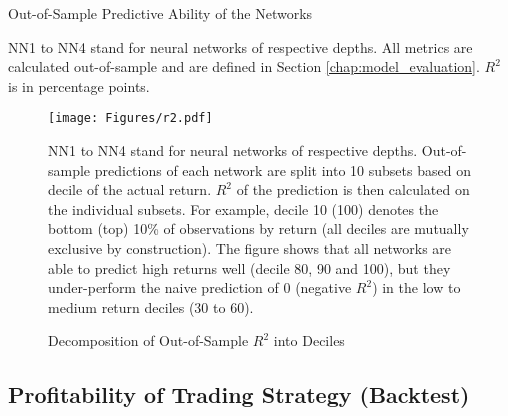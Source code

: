 			\begin{table}
				\centering
				
				\caption{Out-of-Sample Predictive Ability of the Networks}
				\label{tab:performance}
				\medskip
				\small
				NN1 to NN4 stand for neural networks of respective depths. All metrics are calculated out-of-sample and are defined in Section \ref{chap:model_evaluation}.  $R^2$ is in percentage points.  
			\end{table}
		
			\begin{figure}
				\texttt{[image: Figures/r2.pdf]}
				\caption{Decomposition of Out-of-Sample $R^2$ into Deciles}
				\label{fig:r2}
				\medskip
				\small 
				NN1 to NN4 stand for neural networks of respective depths. Out-of-sample predictions of each network are split into 10 subsets based on decile of the actual return. $R^2$ of the prediction is then calculated on the individual subsets. For example, decile 10 (100) denotes the bottom (top) 10\% of observations by return (all deciles are mutually exclusive by construction). The figure shows that all networks are able to predict high returns well (decile 80, 90 and 100), but they under-perform the naive prediction of 0 (negative $R^2$) in the low to medium return deciles (30 to 60).  
			\end{figure}
		

	\subsection{Profitability of Trading Strategy (Backtest)}
		\label{chap:backtest}
		
